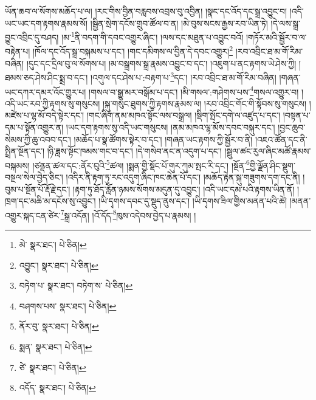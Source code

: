 ཡོན་ཆབ་ལ་སོགས་མཆོད་པ་ལ། །རང་གིས་བྱིན་བརླབས་འབྲས་བུ་འབྱིན། །སྣང་དང་འོད་དང་སྒྲ་འབྱུང་བ། །འདི་ཡང་ཡང་དག་རྟགས་རྣམས་སོ། །སྦྱིན་སྲེག་དངོས་གྲུབ་ཚོལ་བ་ན། །མེ་བུས་སངས་རྒྱས་རབ་ཡིན་ཏེ། །དེ་ལས་སྒྲ་བྱུང་འབྲིང་དུ་བཤད། །མ་\footnote{མེ་  སྣར་ཐང་།  པེ་ཅིན། }ནི་བདག་གི་དབང་འགྱུར་ཞིང་། །ལས་དང་མཐུན་པ་འབྱུང་བའོ། །གཏོར་མའི་སྦྱོར་བ་ལ་བརྟེན་པ། །ཁོལ་དང་འོད་སྒྲ་བསྐམས་པ་དང་། །གང་དམིགས་ལ་བྱིན་དེ་དབང་འགྱུར།\footnote{འབྱུང་།  སྣར་ཐང་།  པེ་ཅིན། } །རབ་འབྲིང་ཐ་མ་གོ་རིམ་བཞིན། །དུང་དང་དྲིལ་བུ་ལ་སོགས་པ། །མ་བསྒྲགས་སྒྲ་རྣམས་འབྱུང་བ་དང་། །འཇུག་པ་ནང་རྟགས་ཡེ་ཤེས་ཀྱི། །ཐམས་ཅད་ཤེས་ཤིང་སྨྲ་བ་དང་། །འགུལ་དང་ཤེས་པ་:བརྟག་པ་\footnote{བཏེག་པ་  སྣར་ཐང་། བཏེག་ས་  པེ་ཅིན། }དང་། །རབ་འབྲིང་ཐ་མ་གོ་རིམ་བཞིན། །གཞན་ཡང་དཀར་དམར་འོང་གྱུར་པ། །གསལ་བ་སྒྱུ་མར་བསྒོམ་པ་དང་། །མི་གསལ་:གཤེགས་པས་\footnote{བཤགས་པས་  སྣར་ཐང་།  པེ་ཅིན། }གསལ་འགྱུར་བ། །འདི་ཡང་རབ་ཀྱི་རྟགས་སུ་གསུངས། །སྐུ་གསུང་ཐུགས་ཀྱི་རྟགས་རྣམས་ལ། །རབ་འབྲིང་གོང་གི་སྟོབས་སུ་གསུངས། །མཛེས་པ་ལྷ་མོ་བདེ་སྟེར་དང་། །གང་ཞིག་ནམ་མཁའ་སྟོང་ལས་བསྒྲལ། །སྡིག་སྤོང་དགེ་ལ་འཛུད་པ་དང་། །བསྟན་པ་དམ་པ་སྟོན་འགྱུར་ན། །ཡང་དག་རྟགས་སུ་འདི་ཡང་གསུངས། །ནམ་མཁའ་ལྷ་མོས་དབང་བསྐུར་དང་། །བྱང་ཆུབ་སེམས་ཀྱི་ཆུ་འབབ་དང་། །མཆོད་པ་སྣ་ཚོགས་སྟེར་བ་དང་། །གཞན་ཡང་རྟགས་ཀྱི་སྦྱོར་བ་ནི། །འཇའ་ཚོན་དང་ནི་སྤྲིན་སྔོན་དང་། །ཉི་ཟླས་སྟོང་ཁམས་གང་བ་དང་། །དེ་གསེབ་ནང་ན་འདུག་པ་དང་། །སྦྲུལ་ཚང་རུལ་ཞིང་མཚོ་རྣམས་བསྐམས། །ཙནྡན་ཚལ་དང་:ནོར་བུའི་\footnote{ནོར་བུ་  སྣར་ཐང་།  པེ་ཅིན། }ཚལ། །སྨན་གྱི་སྡོང་པོ་གུར་ཀུམ་སྤང་རི་དང་། །སྔོན་\footnote{སྨན་  སྣར་ཐང་།  པེ་ཅིན། }གྱི་ལྗོན་ཤིང་སྡུག་བསྔལ་སེལ་བྱེད་ཅིང་། །འདིར་ནི་རྟག་ཏུ་རང་འདུག་ཞིང་ཁང་ཆེན་པོ་དང་། །མཆོད་རྟེན་སྐུ་གཟུགས་དག་དང་ནི། །བུམ་པ་སྔོན་པོ་རྡོ་རྗེ་དང་། །རྟག་ཏུ་ཐོད་རློན་ཉམས་སོགས་མདུན་དུ་འབྱུང་། །འདི་ཡང་དམ་པའི་རྟགས་ཡིན་ནོ། །ཁྲག་དང་མཆི་མ་དངོས་སུ་འབྱུང་། །ཡི་དྭགས་དབང་དུ་སྡུད་ནུས་དང་། །ཡི་དྭགས་ཟིལ་གྱིས་མནན་པའི་ཚེ། །མནན་འགྱུར་སྐད་ངན་ཙེར་\footnote{ཙེ་  སྣར་ཐང་།  པེ་ཅིན། }སྒྲ་འདོན། །འོ་དོད་\footnote{འདོད་  སྣར་ཐང་།  པེ་ཅིན། }ཁུས་འདེབས་བྱེད་པ་རྣམས། །

